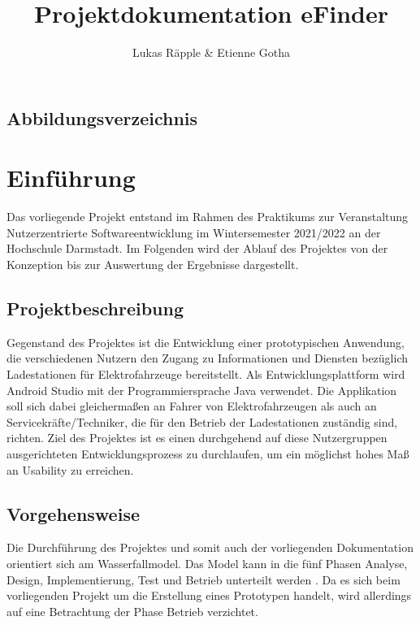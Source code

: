 \documentclass[12pt, a4paper, oneside]{article}
\title{\textbf{Projektdokumentation eFinder}}
\author{Lukas Räpple \& Etienne Gotha}
\newcounter{SeitenzahlSpeicher}
\begin{document}


\begin{spacing}{1}
\setcounter{page}{2}
\tableofcontents
\end{spacing}
\newpage
\begin{spacing}{1}
\section*{Abbildungsverzeichnis} 
\renewcommand{\listfigurename}{}
\listoffigures
\end{spacing}
\newpage
\clearpage
\setcounter{SeitenzahlSpeicher}{\value{page}}
\newpage
{}

\section{Einführung}
Das vorliegende Projekt entstand im Rahmen des Praktikums zur Veranstaltung Nutzerzentrierte Softwareentwicklung im Wintersemester 2021/2022 an der Hochschule Darmstadt. Im Folgenden wird der Ablauf des Projektes von der Konzeption bis zur Auswertung der Ergebnisse dargestellt.

\subsection{Projektbeschreibung}
Gegenstand des Projektes ist die Entwicklung einer prototypischen Anwendung, die verschiedenen Nutzern den Zugang zu Informationen und Diensten bezüglich Ladestationen für Elektrofahrzeuge bereitstellt. Als Entwicklungsplattform wird Android Studio mit der Programmiersprache Java verwendet. Die Applikation soll sich dabei gleichermaßen an Fahrer von Elektrofahrzeugen als auch an Servicekräfte/Techniker, die für den Betrieb der Ladestationen zuständig sind, richten. Ziel des Projektes ist es einen durchgehend auf diese Nutzergruppen ausgerichteten Entwicklungsprozess zu durchlaufen, um ein möglichst hohes Maß an Usability zu erreichen.

\subsection{Vorgehensweise}
Die Durchführung des Projektes und somit auch der vorliegenden Dokumentation orientiert sich am Wasserfallmodel. Das Model kann in die fünf Phasen Analyse, Design, Implementierung, Test und Betrieb unterteilt werden \cite[S. 16 ff.]{SoftwareDevelopmentBestPractices}. Da es sich beim vorliegenden Projekt um die Erstellung eines Prototypen handelt, wird allerdings auf eine Betrachtung der Phase Betrieb verzichtet.\\
\end{document}
